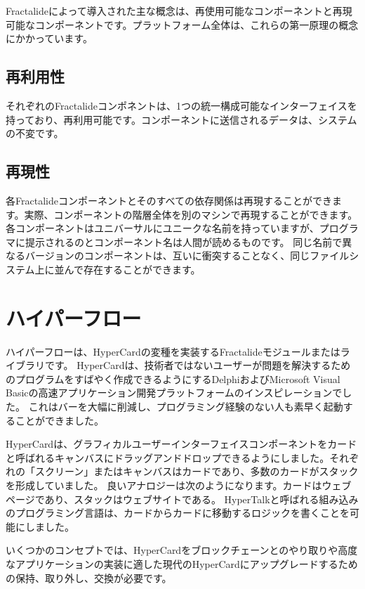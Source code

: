 \documentclass[%
 aip,
 jmp,
 amsmath,amssymb,
 preprint,
 reprint,
 author-year,
 author-numerical,
]{revtex4-1}
\begin{document}
\begin{CJK}{UTF8}{ipxm}
Fractalideによって導入された主な概念は、再使用可能なコンポーネントと再現可能なコンポーネントです。プラットフォーム全体は、これらの第一原理の概念にかかっています。

\subsection{\label{sec:reusability}再利用性}

それぞれのFractalideコンポネントは、1つの統一構成可能なインターフェイスを持っており、再利用可能です。コンポーネントに送信されるデータは、システムの不変です。

\subsection{\label{sec:reproducibility}再現性}

各Fractalideコンポーネントとそのすべての依存関係は再現することができます。実際、コンポーネントの階層全体を別のマシンで再現することができます。
各コンポーネントはユニバーサルにユニークな名前を持っていますが、プログラマに提示されるのとコンポーネント名は人間が読めるものです。
同じ名前で異なるバージョンのコンポーネントは、互いに衝突することなく、同じファイルシステム上に並んで存在することができます。

\section{\label{sec:hyperflow}ハイパーフロー}

ハイパーフローは、HyperCardの変種を実装するFractalideモジュールまたはライブラリです。 HyperCardは、技術者ではないユーザーが問題を解決するためのプログラムをすばやく作成できるようにするDelphiおよびMicrosoft Visual Basicの高速アプリケーション開発プラットフォームのインスピレーションでした。
これはバーを大幅に削減し、プログラミング経験のない人も素早く起動することができました。

HyperCardは、グラフィカルユーザーインターフェイスコンポーネントをカードと呼ばれるキャンバスにドラッグアンドドロップできるようにしました。それぞれの「スクリーン」またはキャンバスはカードであり、多数のカードがスタックを形成していました。 良いアナロジーは次のようになります。カードはウェブページであり、スタックはウェブサイトである。 HyperTalkと呼ばれる組み込みのプログラミング言語は、カードからカードに移動するロジックを書くことを可能にしました。

いくつかのコンセプトでは、HyperCardをブロックチェーンとのやり取りや高度なアプリケーションの実装に適した現代のHyperCardにアップグレードするための保持、取り外し、交換が必要です。


\end{CJK}
\end{document}
